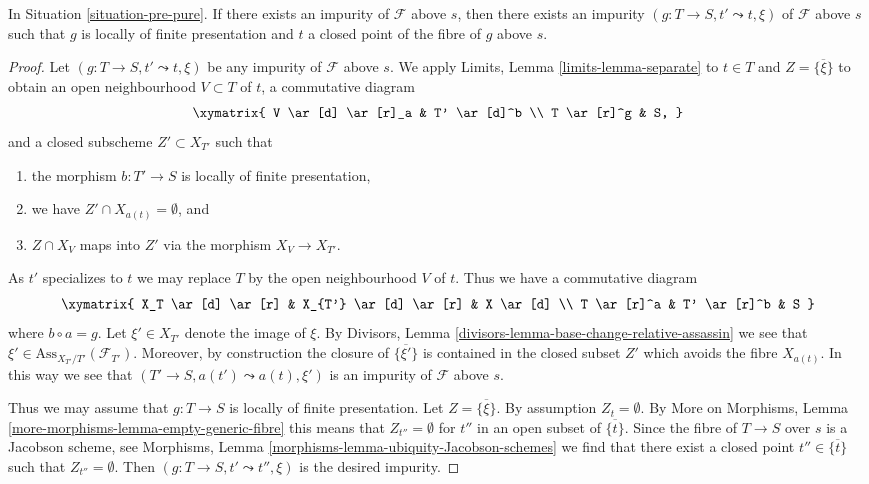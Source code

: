 \begin{lemma}
\label{lemma-impure-finite-presentation}
In Situation \ref{situation-pre-pure}.
If there exists an impurity of $\mathcal{F}$ above $s$, then
there exists an impurity $(g : T \to S, t' \leadsto t, \xi)$
of $\mathcal{F}$ above $s$ such that $g$ is locally of finite
presentation and $t$ a closed point of the fibre of $g$ above $s$.
\end{lemma}

\begin{proof}
Let $(g : T \to S, t' \leadsto t, \xi)$ be any impurity of
$\mathcal{F}$ above $s$. We apply
Limits, Lemma \ref{limits-lemma-separate}
to $t \in T$ and $Z = \overline{\{\xi\}}$ to obtain an open neighbourhood
$V \subset T$ of $t$, a commutative diagram
$$
\xymatrix{
V \ar[d] \ar[r]_a & T' \ar[d]^b \\
T \ar[r]^g & S,
}
$$
and a closed subscheme $Z' \subset X_{T'}$ such that
\begin{enumerate}
\item the morphism $b : T' \to S$ is locally of finite presentation,
\item we have $Z' \cap X_{a(t)} = \emptyset$, and
\item $Z \cap X_V$ maps into $Z'$ via the morphism $X_V \to X_{T'}$.
\end{enumerate}
As $t'$ specializes to $t$ we may replace $T$ by the open neighbourhood
$V$ of $t$. Thus we have a commutative diagram
$$
\xymatrix{
X_T \ar[d] \ar[r] &
X_{T'} \ar[d] \ar[r] &
X \ar[d] \\
T \ar[r]^a & T' \ar[r]^b & S
}
$$
where $b \circ a = g$. Let $\xi' \in X_{T'}$ denote the
image of $\xi$. By
Divisors, Lemma \ref{divisors-lemma-base-change-relative-assassin}
we see that $\xi' \in \text{Ass}_{X_{T'}/T'}(\mathcal{F}_{T'})$.
Moreover, by construction the closure of $\overline{\{\xi'\}}$
is contained in the closed subset $Z'$ which avoids the fibre
$X_{a(t)}$. In this way we see that $(T' \to S, a(t') \leadsto a(t), \xi')$
is an impurity of $\mathcal{F}$ above $s$.

\medskip\noindent
Thus we may assume that $g : T \to S$ is locally of finite presentation.
Let $Z = \overline{\{\xi\}}$. By assumption $Z_t = \emptyset$. By
More on Morphisms, Lemma \ref{more-morphisms-lemma-empty-generic-fibre}
this means that $Z_{t''} = \emptyset$ for $t''$ in an open subset
of $\overline{\{t\}}$. Since the fibre of
$T \to S$ over $s$ is a Jacobson scheme, see
Morphisms, Lemma \ref{morphisms-lemma-ubiquity-Jacobson-schemes}
we find that there exist a closed point $t'' \in \overline{\{t\}}$ such that
$Z_{t''} = \emptyset$. Then $(g : T \to S, t' \leadsto t'', \xi)$ is the
desired impurity.
\end{proof}
